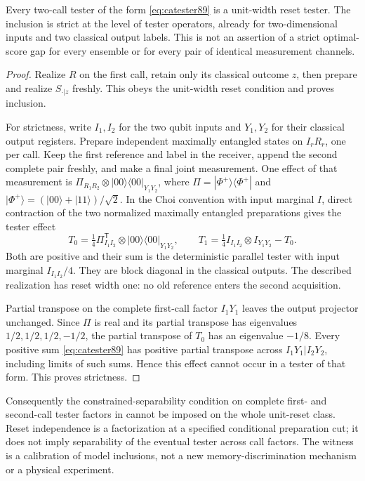 \begin{proposition}\label{prop:memorycomparison89}
Every two-call tester of the form \eqref{eq:catester89} is a unit-width
reset tester.  The inclusion is strict at the level of tester
operators, already for two-dimensional inputs and two classical
output labels.  This is not an assertion of a strict optimal-score
gap for every ensemble or for every pair of identical measurement
channels.
\end{proposition}
\begin{proof}
Realize $R$ on the first call, retain only its classical outcome
$z$, then prepare and realize $S_{\cdot|z}$ freshly.  This obeys the
unit-width reset condition and proves inclusion.

For strictness, write $I_1,I_2$ for the two qubit inputs and $Y_1,Y_2$
for their classical output registers.  Prepare independent maximally
entangled states on $I_rR_r$, one per call.  Keep the first reference
and label in the receiver, append the second complete pair freshly,
and make a final joint measurement.  One effect of that measurement
is $\Pi_{R_1R_2}\otimes|00\rangle\langle00|_{Y_1Y_2}$, where
$\Pi=|\Phi^+\rangle\langle\Phi^+|$ and
$|\Phi^+\rangle=(|00\rangle+|11\rangle)/\sqrt2$.
In the Choi convention with input marginal $I$, direct contraction
of the two normalized maximally entangled preparations gives the
tester effect
\begin{equation}\label{eq:memorywitness89}
 T_0=\tfrac14\Pi^{\mathsf T}_{I_1I_2}
                      \otimes|00\rangle\langle00|_{Y_1Y_2},
 \qquad T_1=\tfrac14 I_{I_1I_2}\otimes I_{Y_1Y_2}-T_0.
\end{equation}
Both are positive and their sum is the deterministic parallel tester
with input marginal $I_{I_1I_2}/4$.  They are block diagonal in the
classical outputs.  The described realization has reset width one:
no old reference enters the second acquisition.

Partial transpose on the complete first-call factor $I_1Y_1$ leaves
the output projector unchanged.  Since $\Pi$ is real and its partial
transpose has eigenvalues $1/2,1/2,1/2,-1/2$, the partial transpose of
$T_0$ has an eigenvalue $-1/8$.  Every positive sum
\eqref{eq:catester89} has positive partial transpose across
$I_1Y_1|I_2Y_2$, including limits of such sums.  Hence this effect
cannot occur in a tester of that form.  This proves strictness.
\end{proof}

Consequently the constrained-separability condition on complete
first- and second-call tester factors in \cite[(65)--(68)]{OZNPQ89}
cannot be imposed on the whole unit-reset class.  Reset independence
is a factorization at a specified conditional preparation cut; it
does not imply separability of the eventual tester across call
factors.  The witness is a calibration of model inclusions, not a
new memory-discrimination mechanism or a physical experiment.

